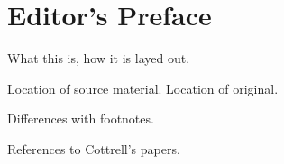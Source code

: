 \chapter{Editor's Preface}
\label{ch:editor}

What this is, how it is layed out.

Location of source material. Location of original.

Differences with footnotes.

References to Cottrell's papers.
